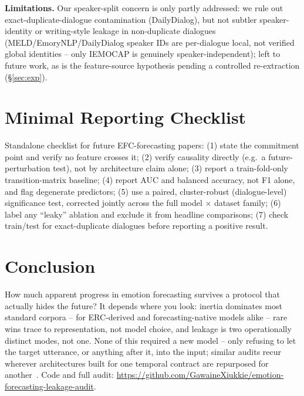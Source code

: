 \documentclass[conference]{IEEEtran}
\begin{document}
\textbf{Limitations.} Our speaker-split concern is only partly addressed: we rule out
exact-duplicate-dialogue contamination (DailyDialog), but not subtler speaker-identity or
writing-style leakage in non-duplicate dialogues (MELD/EmoryNLP/DailyDialog speaker IDs are
per-dialogue local, not verified global identities -- only IEMOCAP is genuinely
speaker-independent); left to future work, as is the feature-source hypothesis pending a
controlled re-extraction (\S\ref{sec:exp}).

\vspace{-3mm}\section{Minimal Reporting Checklist}

Standalone checklist for future EFC-forecasting papers: (1) state the commitment point and verify
no feature crosses it; (2) verify causality directly (e.g.\ a future-perturbation test), not by
architecture claim alone; (3) report a train-fold-only transition-matrix baseline; (4) report AUC
and balanced accuracy, not F1 alone, and flag degenerate predictors; (5) use a paired,
cluster-robust (dialogue-level) significance test, corrected jointly across the full model
$\times$ dataset family; (6) label any ``leaky'' ablation and exclude it from headline comparisons;
(7) check train/test for exact-duplicate dialogues before reporting a positive result.

\vspace{-3mm}\section{Conclusion}

How much apparent progress in emotion forecasting survives a protocol that actually hides the
future? It depends where you look: inertia dominates most standard corpora -- for ERC-derived and
forecasting-native models alike -- rare wins trace to representation, not model choice, and leakage
is two operationally distinct modes, not one. None of this required a new model -- only refusing to let the target utterance, or
anything after it, into the input; similar audits recur wherever architectures built for one
temporal contract are repurposed for
another~\cite{kapoor2023leakage,dacrema2019recsys,lin2019neuralhype}. Code and full
audit: \url{https://github.com/GawaineXiukkie/emotion-forecasting-leakage-audit}.
\end{document}
